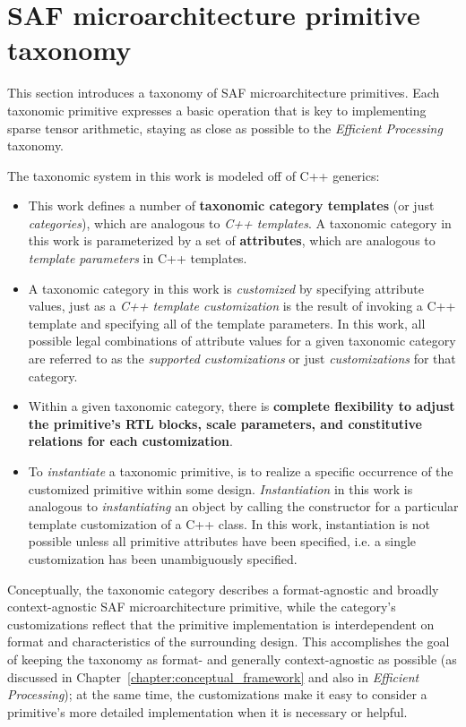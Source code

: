 \chapter{SAF microarchitecture primitive taxonomy}
\label{chapter:primitive_taxo_model}

This section introduces a taxonomy of SAF microarchitecture primitives. Each taxonomic primitive expresses a basic operation that is key to implementing sparse tensor arithmetic, staying as close as possible to the \textit{Efficient Processing}\cite{szebook} taxonomy. 

The taxonomic system in this work is modeled off of C++ generics: 

\begin{itemize}
    \item This work defines a number of \textbf{taxonomic category templates} (or just \textit{categories}), which are analogous to \textit{C++ templates}. A taxonomic category in this work is parameterized by a set of \textbf{attributes}, which are analogous to \textit{template parameters} in C++ templates.
    \item A taxonomic category in this work is \textit{customized} by specifying attribute values, just as a \textit{C++ template customization} is the result of invoking a C++ template and specifying all of the template parameters. In this work, all possible legal combinations of attribute values for a given taxonomic category are referred to as the \textit{supported customizations} or just \textit{customizations} for that category.
    \item Within a given taxonomic category, there is \textbf{complete flexibility to adjust the primitive's RTL blocks, scale parameters, and constitutive relations for each customization}.
    \item To \textit{instantiate} a taxonomic primitive, is to realize a specific occurrence of the customized primitive within some design. \textit{Instantiation} in this work is analogous to \textit{instantiating} an object by calling the constructor for a particular template customization of a C++ class. In this work, instantiation is not possible unless all primitive attributes have been specified, i.e. a single customization has been unambiguously specified.
\end{itemize}

Conceptually, the taxonomic category describes a format-agnostic and broadly context-agnostic SAF microarchitecture primitive, while the category's customizations reflect that the primitive implementation is interdependent on format and characteristics of the surrounding design. This accomplishes the goal of keeping the taxonomy as format- and generally context-agnostic as possible (as discussed in Chapter~\ref{chapter:conceptual_framework} and also in \textit{Efficient Processing}\cite{szebook}); at the same time, the customizations make it easy to consider a primitive's more detailed implementation when it is necessary or helpful.

